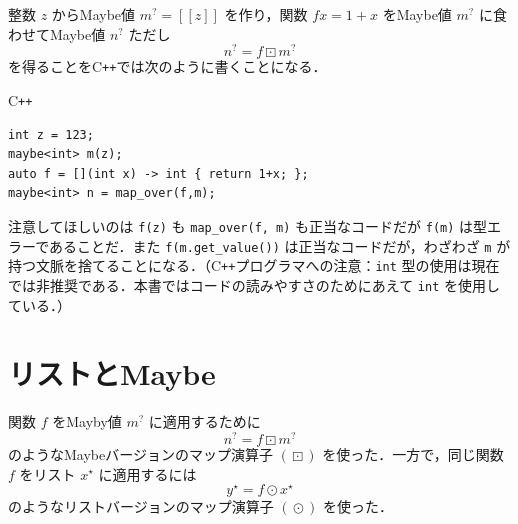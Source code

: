\documentclass[a4paper]{jsbook}
\def\[{\left[\!\left[}
\def\]{\right]\!\right]}
\newcommand{\programminglanguage}[1]{\textsf{#1}}
\newcommand{\cxx}{\programminglanguage{C}\texttt{++}}
\newcommand{\code}[1]{\texttt{#1}}
\newenvironment{cxxcode}{\begin{itembox}[r]{\cxx}}{\end{itembox}}
\newcommand{\mMaybeWith}[1]{\[#1\]}
\newcommand{\mList}[1]{{#1}^\mathrm{\star}}
\newcommand{\mMaybe}[1]{{#1}^\text{?}}
\DeclareMathOperator{\mMapList}{\odot}
\DeclareMathOperator{\mMapMaybe}{\boxdot}
\begin{document}
整数 $z$ からMaybe値 $\mMaybe{m}=\mMaybeWith{z}$ を作り，関数 $fx=1+x$ をMaybe値 $\mMaybe{m}$ に食わせてMaybe値 $\mMaybe{n}$ ただし
\begin{equation}
\mMaybe{n}=f\mMapMaybe\mMaybe{m}
\end{equation}
を得ることを\cxx では次のように書くことになる．
\begin{cxxcode}
\begin{verbatim}
int z = 123;
maybe<int> m(z);
auto f = [](int x) -> int { return 1+x; };
maybe<int> n = map_over(f,m);
\end{verbatim}
\end{cxxcode}
注意してほしいのは \code{f(z)} も \code{map\_over(f, m)} も正当なコードだが \code{f(m)} は型エラーであることだ．また \code{f(m.get\_value())} は正当なコードだが，わざわざ \code{m} が持つ文脈を捨てることになる．（\cxx プログラマへの注意：\code{int} 型の使用は現在では非推奨である．本書ではコードの読みやすさのためにあえて \code{int} を使用している．）


\section{リストとMaybe}

関数 $f$ をMayby値 $\mMaybe{m}$ に適用するために
\begin{equation}
\mMaybe{n}=f\mMapMaybe\mMaybe{m}
\end{equation}
のようなMaybeバージョンのマップ演算子 $(\mMapMaybe)$ を使った．一方で，同じ関数 $f$ をリスト $\mList{x}$ に適用するには
\begin{equation}
\mList{y}=f\mMapList\mList{x}
\end{equation}
のようなリストバージョンのマップ演算子 $(\mMapList)$ を使った．
\end{document}
